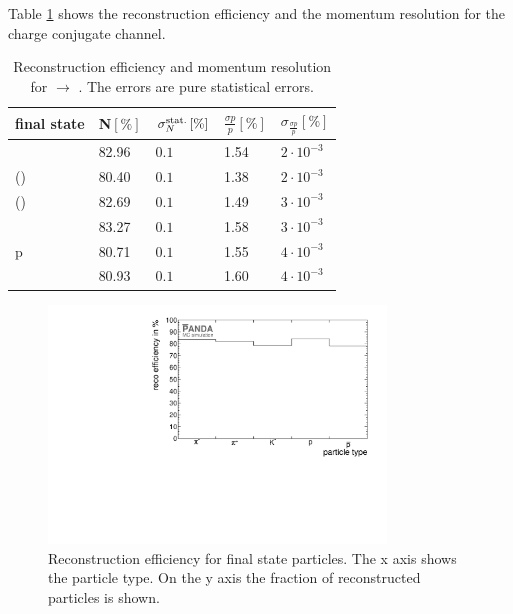 	Table \ref{tab:finalstate_recoeff_cc} shows the reconstruction efficiency and the momentum resolution for the charge conjugate channel.
	
	\begin{table}
		\centering
		\caption{\propose Reconstruction efficiency and momentum resolution for \pbarp $\rightarrow$ \excitedanticascade \cascade. The errors are pure statistical errors.}
		\label{tab:finalstate_recoeff_cc}
		\begin{tabular}{lllll}
			\hline
			final state & N$\left[\%\right]$ & $\sigma_N^{\textnormal{stat.}}\left[\%\right]$ &$\frac{\sigma p}{p}\left[\%\right]$ & $\sigma_\frac{\sigma p}{p}\left[\%\right]$ \\
			\hline
			\hline
			\piplus &  82.96& $0.1$&  1.54 & $2\cdot 10^{-3}$\\
			\piminusone(\cascade) & 80.40& $0.1$&   1.38 & $2\cdot 10^{-3}$  \\
			\piminustwo(\lam) &  82.69&  $0.1$& 1.49& $3\cdot 10^{-3}$\\
			\kplus& 83.27& $0.1$&  1.58 & $3\cdot 10^{-3}$\\
			p &  80.71& $0.1$&  1.55& $4\cdot 10^{-3}$\\
			\antiproton &  80.93& $0.1$&  1.60 & $4\cdot 10^{-3}$\\\hline
			 
		\end{tabular}
	\end{table}
	
	\begin{figure}
	
		\centering
		\includegraphics[width=0.8\textwidth]{./plots/finalstate/reco_efficiency.pdf}
		\caption{\propose Reconstruction efficiency for final state particles. The x axis shows the particle type. 
				On the y axis the fraction of reconstructed particles is shown.}
		\label{fig:finalstate_recoeff}
	
	\end{figure}
	

